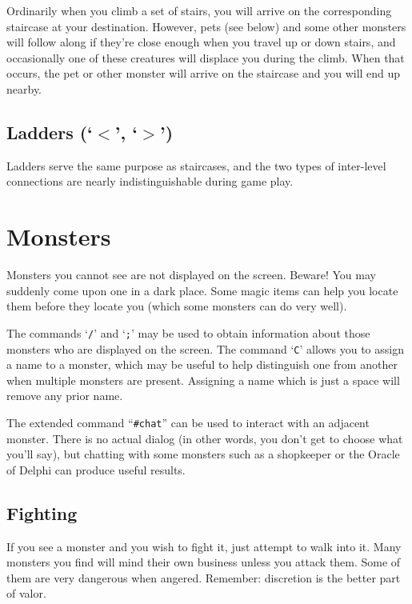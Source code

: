 Ordinarily when you climb a set of stairs, you will arrive on the
corresponding staircase at your destination.  However, pets (see below)
and some other monsters will follow along if they're close enough when
you travel up or down stairs, and occasionally one of these creatures
will displace you during the climb.  When that occurs, the pet or other
monster will arrive on the staircase and you will end up nearby.
\subsection*{Ladders (`{\tt $<$}', `{\tt $>$}')}


Ladders serve the same purpose as staircases, and the two types of
inter-level connections are nearly indistinguishable during game play.

\section{Monsters}


Monsters you cannot see are not displayed on the screen.  Beware!
You may suddenly come upon one in a dark place.  Some magic items can
help you locate them before they locate you (which some monsters can do
very well).

The commands `{\tt /}' and `{\tt ;}' may be used to obtain information about those
monsters who are displayed on the screen.  The command `{\tt C}' allows you
to assign a name to a monster, which may be useful to help distinguish
one from another when multiple monsters are present.  Assigning a name
which is just a space will remove any prior name.

The extended command ``{\tt \#chat}'' can be used to interact with an adjacent
monster.  There is no actual dialog (in other words, you don't get to
choose what you'll say), but chatting with some monsters such as a
shopkeeper or the Oracle of Delphi can produce useful results.
\subsection*{Fighting}


If you see a monster and you wish to fight it, just attempt to walk
into it.  Many monsters you find will mind their own business unless
you attack them.  Some of them are very dangerous when angered.
Remember:  discretion is the better part of valor.
